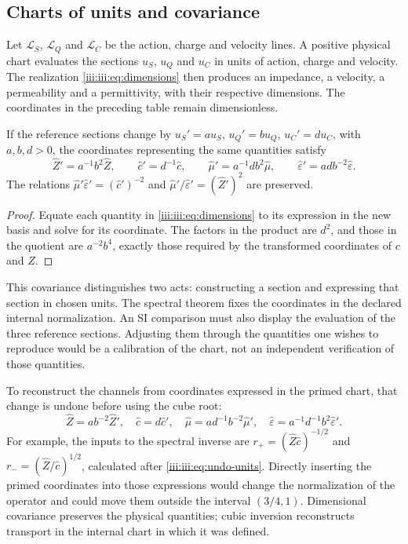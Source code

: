 \subsection{Charts of units and covariance}

Let $\mathcal L_S$, $\mathcal L_Q$ and $\mathcal L_C$ be the action,
charge and velocity lines. A positive physical chart evaluates the sections
$u_S$, $u_Q$ and $u_C$ in units of action, charge and velocity. The realization
\eqref{iii:iii:eq:dimensions} then produces an impedance, a velocity,
a permeability and a permittivity, with their respective dimensions.
The coordinates in the preceding table remain dimensionless.

\begin{proposition}
If the reference sections change by
$u_S'=a u_S$, $u_Q'=b u_Q$, $u_C'=d u_C$, with $a,b,d>0$, the
coordinates representing the same quantities satisfy
\[
 \widehat Z'=a^{-1}b^2\widehat Z,\qquad
 \widehat c'=d^{-1}\widehat c,\qquad
 \widehat\mu'=a^{-1}db^2\widehat\mu,\qquad
 \widehat\varepsilon'=adb^{-2}\widehat\varepsilon.
\]
The relations $\widehat\mu'\widehat\varepsilon'=(\widehat c')^{-2}$
and $\widehat\mu'/\widehat\varepsilon'=(\widehat Z')^2$ are preserved.
\end{proposition}
\begin{proof}
Equate each quantity in \eqref{iii:iii:eq:dimensions} to its expression
in the new basis and solve for its coordinate. The factors in the product
are $d^2$, and those in the quotient are $a^{-2}b^4$, exactly those required
by the transformed coordinates of $c$ and $Z$.
\end{proof}

This covariance distinguishes two acts: constructing a section and expressing
that section in chosen units. The spectral theorem fixes the coordinates
in the declared internal normalization. An SI comparison must also display
the evaluation of the three reference sections. Adjusting them
through the quantities one wishes to reproduce would be a calibration of
the chart, not an independent verification of those quantities.

To reconstruct the channels from coordinates expressed in the primed
chart, that change is undone before using the cube root:
\begin{equation}
 \widehat Z=ab^{-2}\widehat Z',\quad
 \widehat c=d\widehat c',\quad
 \widehat\mu=ad^{-1}b^{-2}\widehat\mu',\quad
 \widehat\varepsilon=a^{-1}d^{-1}b^2\widehat\varepsilon'.
 \label{iii:iii:eq:undo-units}
\end{equation}
For example, the inputs to the spectral inverse are
$r_+=(\widehat Z\widehat c)^{-1/2}$ and
$r_-=(\widehat Z/\widehat c)^{1/2}$, calculated after
\eqref{iii:iii:eq:undo-units}. Directly inserting the primed coordinates
into those expressions would change the normalization of the operator and could
move them outside the interval $(3/4,1)$. Dimensional covariance preserves
the physical quantities; cubic inversion reconstructs transport
in the internal chart in which it was defined.

